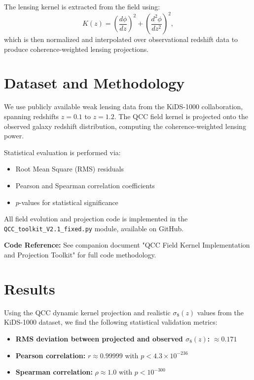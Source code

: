 \documentclass[12pt]{article}
\begin{document}
The lensing kernel is extracted from the field using:
\begin{equation}
    K(z) = \left(\frac{d\phi}{dz}\right)^2 + \left(\frac{d^2\phi}{dz^2}\right)^2,
\end{equation}
which is then normalized and interpolated over observational redshift data to produce coherence-weighted lensing projections.

\section{Dataset and Methodology}
We use publicly available weak lensing data from the KiDS-1000 collaboration, spanning redshifts $z = 0.1$ to $z = 1.2$. The QCC field kernel is projected onto the observed galaxy redshift distribution, computing the coherence-weighted lensing power.

Statistical evaluation is performed via:
\begin{itemize}
    \item Root Mean Square (RMS) residuals
    \item Pearson and Spearman correlation coefficients
    \item $p$-values for statistical significance
\end{itemize}

All field evolution and projection code is implemented in the \texttt{QCC\_toolkit\_V2.1\_fixed.py} module, available on GitHub.

\textbf{Code Reference:} See companion document "QCC Field Kernel Implementation and Projection Toolkit" for full code methodology.

\section{Results}
Using the QCC dynamic kernel projection and realistic $\sigma_8(z)$ values from the KiDS-1000 dataset, we find the following statistical validation metrics:

\begin{itemize}
	\item \textbf{RMS deviation between projected and observed $\sigma_8(z)$:} $\approx 0.171$
	\item \textbf{Pearson correlation:} $r \approx 0.99999$ with $p < 4.3 \times 10^{-236}$
	\item \textbf{Spearman correlation:} $\rho \approx 1.0$ with $p < 10^{-300}$
\end{itemize}
\end{document}
